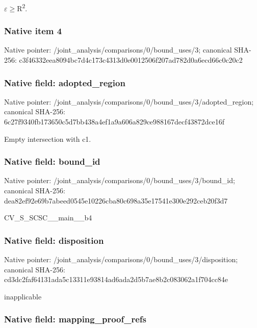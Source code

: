 \documentclass[10pt,a4paper]{article}
\begin{document}
\ensuremath{\varepsilon}\ensuremath{\ge}R\textsuperscript{2}.


\subsubsection{Native item 4}


Native pointer: /joint\_analysis/comparis\allowbreak{}ons/0/bound\_uses/3; canonical SHA-256: c3f46332eea8094bc7d4c173\allowbreak{}c4313d0e0012506f207ad782\allowbreak{}d0a6ecd66c0c20c2



\subsubsection{Native field: adopted\_region}


Native pointer: /joint\_analysis/comparis\allowbreak{}ons/0/bound\_uses/3/adopt\allowbreak{}ed\_region; canonical SHA-256: 6c27f9340fb173650c5d7bb4\allowbreak{}38a4ef1a9a606a829ce98816\allowbreak{}7decf43872dce16f


Empty intersection with c1.


\subsubsection{Native field: bound\_id}


Native pointer: /joint\_analysis/comparis\allowbreak{}ons/0/bound\_uses/3/bound\allowbreak{}\_id; canonical SHA-256: dea82ef92e69b7abeed0545e\allowbreak{}10226cba80c698a35e17541e\allowbreak{}300e292ceb20f3d7


CV\_S\_SCSC\_\_main\_\_b4


\subsubsection{Native field: disposition}


Native pointer: /joint\_analysis/comparis\allowbreak{}ons/0/bound\_uses/3/dispo\allowbreak{}sition; canonical SHA-256: cd3dc2faf64131ada5c13311\allowbreak{}e93814ad6ada2d5b7ae8b2c0\allowbreak{}83062a1f704cc84e


inapplicable


\subsubsection{Native field: mapping\_proof\_refs}
\end{document}
